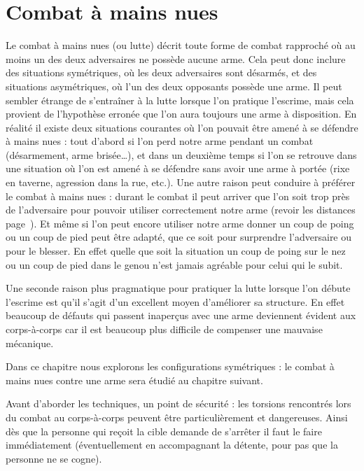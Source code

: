 \chapter{Combat à mains nues}


Le combat à mains nues (ou lutte) décrit toute forme de combat rapproché où au moins un des deux adversaires ne possède aucune arme.
Cela peut donc inclure des situations symétriques, où les deux adversaires sont désarmés, et des situations asymétriques, où l'un des deux opposants possède une arme.
Il peut sembler étrange de s'entraîner à la lutte lorsque l'on pratique l'escrime, mais cela provient de l'hypothèse erronée que l'on aura toujours une arme à disposition.
En réalité il existe deux situations courantes où l'on pouvait être amené à se défendre à mains nues : tout d'abord si l'on perd notre arme pendant un combat (désarmement, arme brisée…), et dans un deuxième temps si l'on se retrouve dans une situation où l'on est amené à se défendre sans avoir une arme à portée (rixe en taverne, agression dans la rue, etc.).
Une autre raison peut conduire à préférer le combat à mains nues : durant le combat il peut arriver que l'on soit trop près de l'adversaire pour pouvoir utiliser correctement notre arme (revoir les distances page~\pageref{conc:def:distances}).
Et même si l'on peut encore utiliser notre arme donner un coup de poing ou un coup de pied peut être adapté, que ce soit pour surprendre l'adversaire ou pour le blesser.
En effet quelle que soit la situation un coup de poing sur le nez ou un coup de pied dans le genou n'est jamais agréable pour celui qui le subit.

Une seconde raison plus pragmatique pour pratiquer la lutte lorsque l'on débute l'escrime est qu'il s'agit d'un excellent moyen d'améliorer sa structure.
En effet beaucoup de défauts qui passent inaperçus avec une arme deviennent évident aux corps-à-corps car il est beaucoup plus difficile de compenser une mauvaise mécanique.

Dans ce chapitre nous explorons les configurations symétriques : le combat à mains nues contre une arme sera étudié au chapitre suivant.

Avant d'aborder les techniques, un point de sécurité : les torsions rencontrés lors du combat au corps-à-corps peuvent être particulièrement et dangereuses.
Ainsi dès que la personne qui reçoit la cible demande de s'arrêter il faut le faire immédiatement (éventuellement en accompagnant la détente, pour pas que la personne ne se cogne).


